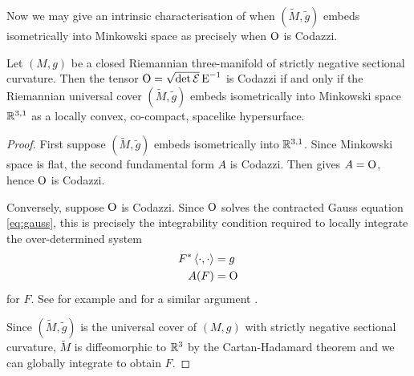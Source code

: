 \documentclass[a4paper,12pt]{amsart}
\begin{document}
Now we may give an intrinsic characterisation of when \((\tilde{M}, \tilde{g})\) embeds isometrically into Minkowski space as precisely when \(\operatorname{O}\) is Codazzi.

\begin{thm}
\label{thm:intg_embed}

Let \((M, g)\) be a closed Riemannian three-manifold of strictly negative sectional curvature. Then the tensor \(\operatorname{O} = \sqrt{\det \operatorname{\mathcal{E}}} \operatorname{E}^{-1}\) is Codazzi if and only if the Riemannian universal cover \((\tilde{M}, \tilde{g})\) embeds isometrically into Minkowski space \(\mathbb{R}^{3,1}\) as a locally convex, co-compact, spacelike hypersurface.
\end{thm}

\begin{proof}
First suppose \((\tilde{M}, \tilde{g})\) embeds isometrically into \(\mathbb{R}^{3,1}\). Since Minkowski space is flat, the second fundamental form \(A\) is Codazzi. Then  gives \(A = \operatorname{O}\), hence \(\operatorname{O}\) is Codazzi.

Conversely, suppose \(\operatorname{O}\) is Codazzi. Since $\operatorname{O}$ solves the contracted Gauss equation \eqref{eq:gauss}, this is precisely the integrability condition required to locally integrate the over-determined system
\begin{align*}
F^{\ast} \left\langle \cdot,\cdot \right\rangle &= g \\
A(F) &= \operatorname{O}
\end{align*}
for \(F\). See for example \cite[Theorem 7]{MR1713298} and for a similar argument \cite[Chapter VI.12, p. 146 and Theorem V, p.393]{MR1013365}.

Since \((\tilde{M}, \tilde{g})\) is the universal cover of \((M, g)\) with strictly negative sectional curvature, \(\tilde{M}\) is diffeomorphic to \(\mathbb{R}^3\) by the Cartan-Hadamard theorem and we can globally integrate to obtain \(F\).
\end{proof}
\end{document}
